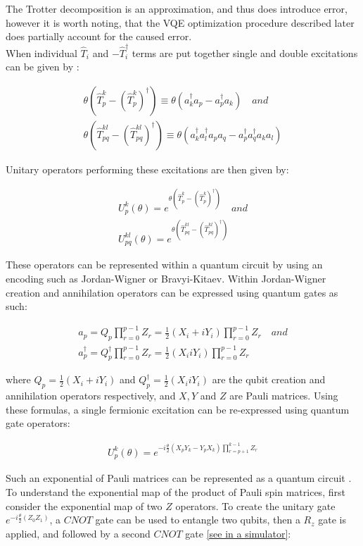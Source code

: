 \documentclass[twoside,twocolumn,9pt]{article}
\begin{document}
The Trotter decomposition is an approximation, and thus does introduce error, however it is worth noting, that the VQE optimization procedure described later does partially account for the caused error.\\
When individual $\hat{T}_i$ and $-\hat{T}_i^{\dagger}$ terms are put together single and double excitations can be given by \cite{Yordanov2020}:

\begin{align}
  \theta(\hat{T}_p^k-(\hat{T}_p^k)^{\dagger})\equiv\theta(a^{\dagger}_k a_p-a^{\dagger}_p a_k) \quad and\\
  \theta(\hat{T}_{pq}^{kl}-(\hat{T}_{pq}^{kl})^{\dagger})\equiv\theta(a^{\dagger}_k a^{\dagger}_l  a_p a_q - a^{\dagger}_p a^{\dagger}_q a_k a_l)
\end{align}

Unitary operators performing these excitations are then given by:

\begin{align}
U_p^k(\theta)=e^{\theta(\hat{T}_p^k-(\hat{T}_p^k)^{\dagger})} \quad and\\
U_{pq}^{kl}(\theta)=e^{\theta(\hat{T}_{pq}^{kl}-(\hat{T}_{pq}^{kl})^{\dagger})}
\end{align}

These operators can be represented within a quantum circuit by using an encoding such as Jordan-Wigner or Bravyi-Kitaev. Within Jordan-Wigner creation and annihilation operators can be expressed using quantum gates as such:

\begin{align}
a_p=Q_p\prod_{r=0}^{p-1}Z_r=\frac{1}{2}(X_i+iY_i)\prod_{r=0}^{p-1}Z_r \quad and\\
a_p^{\dagger}=Q_p^{\dagger}\prod_{r=0}^{p-1}Z_r=\frac{1}{2}(X_iiY_i)\prod_{r=0}^{p-1}Z_r \quad
\end{align}

where $Q_p=\frac{1}{2}(X_i+iY_i)$ and $Q_p^{\dagger}=\frac{1}{2}(X_iiY_i)$ are the qubit creation and annihilation operators respectively, and $X,Y$ and $Z$ are Pauli matrices. Using these formulas, a single fermionic excitation can be re-expressed using quantum gate operators:

\begin{align}
  U_p^k(\theta)=e^{-i\frac{\theta}{2}(X_pY_k-Y_pX_k)\prod_{r=p+1}^{k-1}Z_r}
\end{align}

Such an exponential of Pauli matrices can be represented as a quantum circuit \cite{Whitfield2011}. To understand the exponential map of the product of Pauli spin matrices, first consider the exponential map of two $Z$ operators. To create the unitary gate $e^{-i\frac{\theta}{2}(Z_0Z_1)}$, a $CNOT$ gate can be used to entangle two qubits, then a $R_z$ gate is applied, and followed by a second $CNOT$ gate \href{https://algassert.com/quirk#circuit={%22cols%22:[[%22Bloch%22,%22Bloch%22],[%22%E2%80%A2%22,%22X%22],[1,%22Rzft%22],[],[%22%E2%80%A2%22,%22X%22]],%22init%22:[1]}}{[see in a simulator]}:
\end{document}
